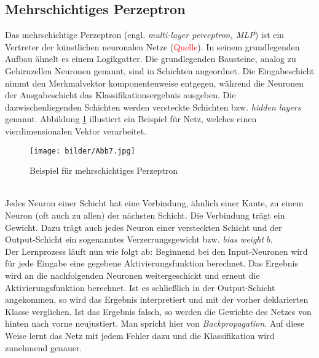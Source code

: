\subsection{Mehrschichtiges Perzeptron}
Das mehrschichtige Perzeptron (engl. \textit{multi-layer perceptron, MLP}) ist ein Vertreter der künstlichen neuronalen Netze (\textcolor{red}{Quelle}). In seinem grundlegenden Aufbau ähnelt es einem Logikgatter. Die grundlegenden Bausteine, analog zu Gehirnzellen Neuronen genannt, sind in Schichten angeordnet. Die Eingabeschicht nimmt den Merkmalvektor komponentenweise entgegen, während die Neuronen der Ausgabeschicht das Klassifikationsergebnis ausgeben. Die dazwischenliegenden Schichten werden versteckte Schichten bzw. \textit{hidden layers} genannt. Abbildung \ref{mlp-ex} illustiert ein Beispiel für Netz, welches einen vierdimensionalen Vektor verarbeitet.\\
 \begin{figure}[htb]
	\begin{center}
		\texttt{[image: bilder/Abb7.jpg]}
		\caption{Beispiel für mehrschichtiges Perzeptron}\label{mlp-ex}
	\end{center}
\end{figure}\\
Jedes Neuron einer Schicht hat eine Verbindung, ähnlich einer Kante, zu einem Neuron (oft auch zu allen) der nächsten Schicht. Die Verbindung trägt ein Gewicht. Dazu trägt auch jedes Neuron einer versteckten Schicht und der Output-Schicht ein sogenanntes Verzerrungsgewicht bzw. \textit{bias weight} $b$.\\
 Der Lernprozess läuft nun wie folgt ab: Beginnend bei den Input-Neuronen wird für jede Eingabe eine gegebene Aktivierungsfunktion berechnet. Das Ergebnis wird an die nachfolgenden Neuronen weitergeschickt und erneut die Aktivierungsfunktion berechnet. Ist es schließlich in der Output-Schicht angekommen, so wird das Ergebnis interpretiert und mit der vorher deklarierten Klasse verglichen. Ist das Ergebnis falsch, so werden die Gewichte des Netzes von hinten nach vorne neujustiert. Man spricht hier von \textit{Backpropagation}. Auf diese Weise lernt das Netz mit jedem Fehler dazu und die Klassifikation wird zunehmend genauer.	
\pagebreak